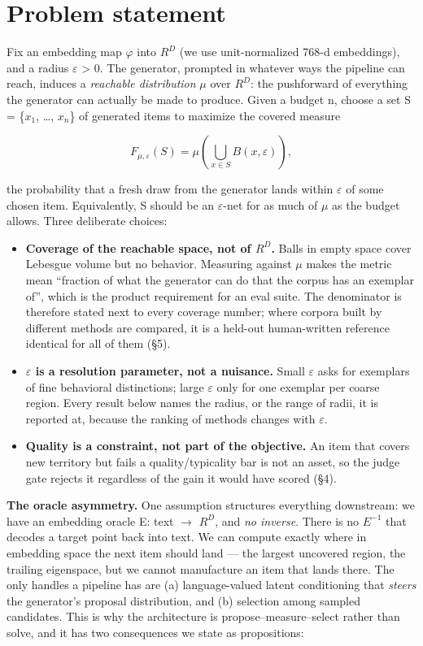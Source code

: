 \documentclass[11pt]{article}
\theoremstyle{plain}
\theoremstyle{definition}
\begin{document}
\section{Problem statement}
Fix an embedding map $\varphi$ into $R^{D}$ (we use unit-normalized 768-d embeddings), and a radius $\varepsilon$ > 0. The generator, prompted in whatever ways the pipeline can reach, induces a \emph{reachable distribution} $\mu$ over $R^{D}$: the pushforward of everything the generator can actually be made to produce. Given a budget n, choose a set S = \{$x_{1}$, \ldots{}, $x_{n}$\} of generated items to maximize the covered measure

\[
F_{\mu ,\varepsilon }(S) = \mu ( \bigcup _{x\in S} B(x, \varepsilon ) ),
\]

the probability that a fresh draw from the generator lands within $\varepsilon$ of some chosen item. Equivalently, S should be an $\varepsilon$-net for as much of $\mu$ as the budget allows. Three deliberate choices:

\begin{itemize}
  \item \textbf{Coverage of the reachable space, not of $R^{D}$.} Balls in empty space cover Lebesgue volume but no behavior. Measuring against $\mu$ makes the metric mean ``fraction of what the generator can do that the corpus has an exemplar of'', which is the product requirement for an eval suite. The denominator is therefore stated next to every coverage number; where corpora built by different methods are compared, it is a held-out human-written reference identical for all of them (\S{}5).
  \item \textbf{$\varepsilon$ is a resolution parameter, not a nuisance.} Small $\varepsilon$ asks for exemplars of fine behavioral distinctions; large $\varepsilon$ only for one exemplar per coarse region. Every result below names the radius, or the range of radii, it is reported at, because the ranking of methods changes with $\varepsilon$.
  \item \textbf{Quality is a constraint, not part of the objective.} An item that covers new territory but fails a quality/typicality bar is not an asset, so the judge gate rejects it regardless of the gain it would have scored (\S{}4).
\end{itemize}

\textbf{The oracle asymmetry.} One assumption structures everything downstream: we have an embedding oracle E: text $\to$ $R^{D}$, and \emph{no inverse}. There is no $E^{-1}$ that decodes a target point back into text. We can compute exactly where in embedding space the next item should land --- the largest uncovered region, the trailing eigenspace, but we cannot manufacture an item that lands there. The only handles a pipeline has are (a) language-valued latent conditioning that \emph{steers} the generator's proposal distribution, and (b) selection among sampled candidates. This is why the architecture is propose--measure--select rather than solve, and it has two consequences we state as propositions:
\end{document}
